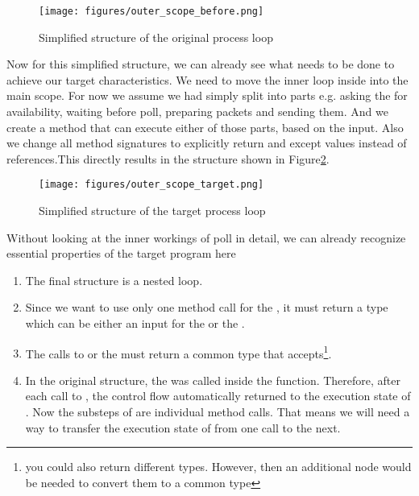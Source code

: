 \begin{figure}[H]
    \centering
    \texttt{[image: figures/outer\_scope\_before.png]}
    \caption{Simplified structure of the original process loop}
    \label{fig:mainLoopOriginal}
\end{figure}

Now for this simplified structure, we can already see what needs to be done to achieve our target characteristics. We need to move the inner loop inside  into the main scope.
For now we assume we had simply split  into parts e.g. asking the  for availability, waiting before poll, preparing packets and sending them. And we create a method  that can execute either of those parts, based on the input.
Also we change all method signatures to explicitly return and except values instead of references.This directly results in the structure shown in Figure\ref{fig:mainLoopTarget}. 

\begin{figure}[H]
    \centering
    \texttt{[image: figures/outer\_scope\_target.png]}
    \caption{Simplified structure of the target process loop}
    \label{fig:mainLoopTarget}
\end{figure}

Without looking at the inner workings of poll in detail, we can already recognize essential properties of the target program here

\begin{enumerate}
    \item The final structure is a nested loop.
    \item Since we want to use only one method call for the , it must return a type which can be either an input for the  or the .
    \item The calls to  or the  must return a common type that  accepts\footnote{you could also return different types. However, then an additional node would be needed to convert them to a common type}.
    \item In the original structure, the  was called inside the  function. Therefore, after each call to , the control flow automatically returned to the execution state of . Now the substeps of  are individual method calls. That means we will need a way to transfer the execution state of  from one call to the next. 
\end{enumerate}

